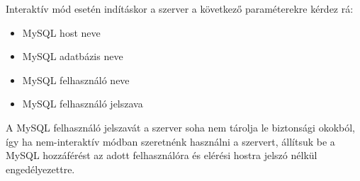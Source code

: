 \documentclass[a4paper,12pt]{article}
\begin{document}
Interaktív mód esetén indításkor a szerver a következő paraméterekre kérdez rá:

\begin{itemize}
\item MySQL host neve
\item MySQL adatbázis neve
\item MySQL felhasználó neve
\item MySQL felhasználó jelszava
\end{itemize}

A MySQL felhasználó jelszavát a szerver soha nem tárolja le biztonsági okokból,
így ha nem-interaktív módban szeretnénk használni a szervert, állítsuk be a
MySQL hozzáférést az adott felhasználóra és elérési hostra jelszó nélkül
engedélyezettre.
\end{document}
